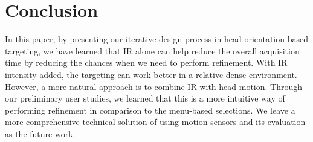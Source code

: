 
\section{Conclusion}
\label{sec:conclusion}

In this paper, by presenting our iterative design process in head-orientation based targeting, we have learned that IR alone can help reduce the overall acquisition time by reducing the chances when we need to perform refinement. With IR intensity added, the targeting can work better in a relative dense environment. However, a more natural approach is to combine IR with head motion. Through our preliminary user studies, we learned that this is a more intuitive way of performing refinement in comparison to the menu-based selections. We leave a more comprehensive technical solution of using motion sensors and its evaluation as the future work.

